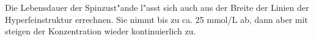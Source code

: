 \documentclass[a4paper,12pt]{article}
\begin{document}
Die Lebensdauer der Spinzust"ande l"asst sich auch aus der Breite der
Linien der Hyperfeinstruktur errechnen. Sie nimmt bis zu ca. 25 mmol/L
ab, dann aber mit steigen der Konzentration wieder kontinuierlich zu.












\nocite{hw_klein}
\nocite{hw_gross}
\nocite{mikrowellen}
\nocite{beilage_ausfuehrlich}
\nocite{lockin}
\nocite{paper_cu}
\nocite{paper_exchange}



\end{document}
